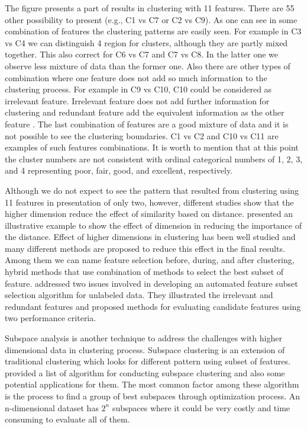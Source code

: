 The figure presents a part of results in clustering with 11 features. There are 55 other possibility to present (e.g., C1 vs C7 or C2 vs C9). As one can see in some combination of features the clustering patterns are easily seen. For example in C3 vs C4 we can distinguish 4 region for clusters, although they are partly mixed together. This also correct for C6 vs C7 and C7 vs C8. In the latter one we observe less mixture of data than the former one. Also there are other types of combination where one feature does not add so much information to the clustering process. For example in C9 vs C10, C10 could be considered as irrelevant feature. Irrelevant feature does not add further information for clustering and redundant feature add the equivalent information as the other feature \citep{Dy_2004_MLR}. The last combination of features are a good mixture of data and it is not possible to see the clustering boundaries. C1 vs C2 and C10 vs C11 are examples of such features combinations. It is worth to mention that at this point the cluster numbers are not consistent with ordinal categorical numbers of 1, 2, 3, and 4 representing poor, fair, good, and excellent, respectively.

Although we do not expect to see the pattern that resulted from clustering using 11 features in presentation of only two, however, different studies show that the higher dimension reduce the effect of similarity based on distance. \citet{Parsons_2004_ACM} presented an illustrative example to show the effect of dimension in reducing the importance of the distance. Effect of higher dimensions in clustering has been well studied and many different methods are proposed to reduce this effect in the final results. Among them we can name  feature selection before, during, and after clustering, hybrid methods that use combination of methods to select the best subset of feature. \citet{Dy_2004_MLR} addressed two issues involved in developing an automated feature subset selection algorithm for unlabeled data. They illustrated the irrelevant and redundant features and proposed methods for evaluating candidate features using two performance criteria.

Subspace analysis is another technique to address the challenges with higher dimensional data in clustering process. Subspace clustering is an extension of traditional clustering which looks for different pattern using subset of features.  \citet{Parsons_2004_ACM} provided a list of algorithm for conducting subspace clustering and also some potential applications for them. The most common factor among these algorithm is the process to find a group of best subspaces through optimization process. An n-dimensional dataset has $2^n$ subspaces where it could be very costly and time consuming to evaluate all of them.

